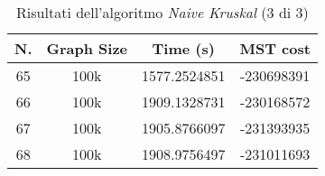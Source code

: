 \begin{table}[H]
	\centering
	\begin{tabular}{|c|c|c|c|}
		\hline
		\textbf{N.} & \textbf{Graph Size} & \textbf{Time (s)} & \textbf{MST cost}\\
		\hline
		65 & 100k & 1577.2524851 & -230698391\\
		\hline
		66 & 100k & 1909.1328731 & -230168572\\
		\hline
		67 & 100k & 1905.8766097 & -231393935\\
		\hline
		68 & 100k & 1908.9756497 & -231011693\\
		\hline
	\end{tabular}
\caption{Risultati dell'algoritmo \textit{Naive Kruskal} (3 di 3)}
\end{table}